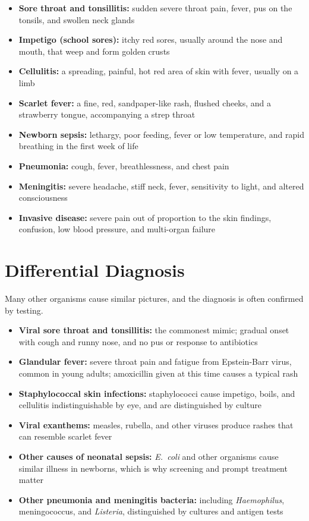 \begin{itemize}
    \item \textbf{Sore throat and tonsillitis:} sudden severe throat pain, fever, pus on the tonsils, and swollen neck glands
    \item \textbf{Impetigo (school sores):} itchy red sores, usually around the nose and mouth, that weep and form golden crusts
    \item \textbf{Cellulitis:} a spreading, painful, hot red area of skin with fever, usually on a limb
    \item \textbf{Scarlet fever:} a fine, red, sandpaper-like rash, flushed cheeks, and a strawberry tongue, accompanying a strep throat
    \item \textbf{Newborn sepsis:} lethargy, poor feeding, fever or low temperature, and rapid breathing in the first week of life
    \item \textbf{Pneumonia:} cough, fever, breathlessness, and chest pain
    \item \textbf{Meningitis:} severe headache, stiff neck, fever, sensitivity to light, and altered consciousness
    \item \textbf{Invasive disease:} severe pain out of proportion to the skin findings, confusion, low blood pressure, and multi-organ failure
\end{itemize}

\section*{Differential Diagnosis}
Many other organisms cause similar pictures, and the diagnosis is often confirmed by testing.

\begin{itemize}
    \item \textbf{Viral sore throat and tonsillitis:} the commonest mimic; gradual onset with cough and runny nose, and no pus or response to antibiotics
    \item \textbf{Glandular fever:} severe throat pain and fatigue from Epstein-Barr virus, common in young adults; amoxicillin given at this time causes a typical rash
    \item \textbf{Staphylococcal skin infections:} staphylococci cause impetigo, boils, and cellulitis indistinguishable by eye, and are distinguished by culture
    \item \textbf{Viral exanthems:} measles, rubella, and other viruses produce rashes that can resemble scarlet fever
    \item \textbf{Other causes of neonatal sepsis:} \textit{E.~coli} and other organisms cause similar illness in newborns, which is why screening and prompt treatment matter
    \item \textbf{Other pneumonia and meningitis bacteria:} including \textit{Haemophilus}, meningococcus, and \textit{Listeria}, distinguished by cultures and antigen tests
\end{itemize}

